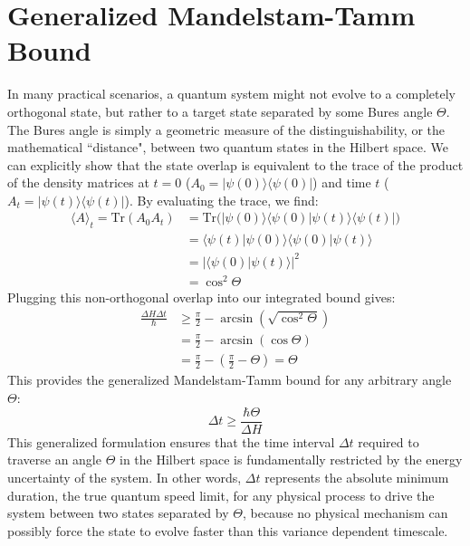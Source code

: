 \section{Generalized Mandelstam-Tamm Bound}
In many practical scenarios, a quantum system might not evolve to a completely orthogonal state, but rather to a target state separated by some Bures angle $\Theta$. The Bures angle is simply a geometric measure of the distinguishability, or the mathematical ``distance", between two quantum states in the Hilbert space. We can explicitly show that the state overlap is equivalent to the trace of the product of the density matrices at $t=0$ ($A_0 = |\psi(0)\rangle\langle\psi(0)|$) and time $t$ ($A_t = |\psi(t)\rangle\langle\psi(t)|$). By evaluating the trace, we find:
\begin{align}
    \langle A \rangle_t = \text{Tr}(A_0 A_t) &= \text{Tr} \Big( |\psi(0)\rangle\langle\psi(0)| \psi(t)\rangle\langle\psi(t)| \Big) \nonumber \\
    &= \langle\psi(t)|\psi(0)\rangle \langle\psi(0)|\psi(t)\rangle \nonumber \\
    &= |\langle\psi(0)|\psi(t)\rangle|^2 \nonumber \\
    &= \cos^2\Theta
\end{align}
Plugging this non-orthogonal overlap into our integrated bound gives:
\begin{align}
    \frac{\Delta H \Delta t}{\hbar} &\ge \frac{\pi}{2} - \arcsin\left(\sqrt{\cos^2\Theta}\right) \nonumber \\
    &= \frac{\pi}{2} - \arcsin(\cos\Theta) \nonumber \\
    &= \frac{\pi}{2} - \left( \frac{\pi}{2} - \Theta \right) = \Theta
\end{align}
This provides the generalized Mandelstam-Tamm bound for any arbitrary angle $\Theta$:
\begin{equation}
    \Delta t \ge \frac{\hbar \Theta}{\Delta H}
\end{equation}
This generalized formulation ensures that the time interval $\Delta t$ required to traverse an angle $\Theta$ in the Hilbert space is fundamentally restricted by the energy uncertainty of the system. In other words, $\Delta t$ represents the absolute minimum duration, the true quantum speed limit, for any physical process to drive the system between two states separated by $\Theta$, because no physical mechanism can possibly force the state to evolve faster than this variance dependent timescale.
